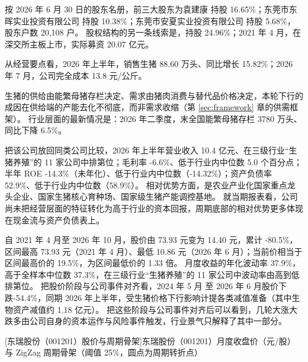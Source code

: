  按 2026 年 6 月 30 日的股东名册，前三大股东为袁建康 持股 16.65\%；东莞市东晖实业投资有限公司 持股 10.38\%；东莞市安夏实业投资有限公司 持股 5.68\%，股东户数 20,108 户。 股权结构的另一条线索是，持股 24.96\%；2021 年 4 月，在深交所主板上市，实际募资 20.07 亿元。

 从经营要点看，2026 年上半年，销售生猪 88.60 万头、同比增长 15.82\%；2026 年 7 月，公司完全成本 13.8 元/公斤。

 生猪的供给由能繁母猪存栏决定、需求由猪肉消费与替代品价格决定，本轮下行的成因在供给端的产能去化不彻底，而非需求收缩（第 \ref{sec:framework} 章的供需框架）。 行业层面的最新情况是：2026 年二季度，末全国能繁母猪存栏 3780 万头、同比下降 6.5\%。

 把该公司放回同类公司比较，2026 年上半年营业收入 10.4 亿元、在三级行业“生猪养殖”的 11 家公司中排第位；毛利率 -6.6\%、低于行业内中位数 5.0 个百分点；半年 ROE -14.3\%（未年化）、低于行业内中位数（-14.32\%）；资产负债率 52.9\%、低于行业内中位数（58.9\%）。 相对优势方面，是农业产业化国家重点龙头企业、国家生猪核心育种场、国家级生猪产能调控基地。 就当期报表看，公司尚未把经营层面的特征转化为高于行业的资本回报，周期底部的相对优势更多体现在现金流与资产负债表上。

 自 2021 年 4 月至 2026 年 10 月，股价由 73.93 元变为 14.40 元，累计 -80.5\%，区间最高 73.93 元（2021 年 4 月）、最低 10.86 元（2026 年 6 月）；当前价相当于区间最高价的 19.5\%，为区间最低价的 1.33 倍。 月度收益的年化波动率 37.9\%，高于全样本中位数 37.3\%，在三级行业“生猪养殖”的 11 家公司中波动率由高到低排第位。 把股价阶段与公司事件对齐看，2024 年 5 月 至 2026 年 6 月股价下跌-54.4\%，同期 2026 年上半年，受生猪价格下行影响计提各类减值准备（其中生物资产减值约 1.18 亿元）。 把这些阶段与公司事件对齐后可以看到，几轮大涨大跌多由公司自身的资本运作与风险事件触发，行业景气只解释了其中一部分。

\begin{center}
\begin{minipage}{\textwidth}\centering
{}

[东瑞股份（001201）股价与周期骨架]{东瑞股份（001201）月度收盘价（元/股）与 ZigZag 周期骨架（阈值 25\%，圆点为周期转折点）}
\end{minipage}
\end{center}


